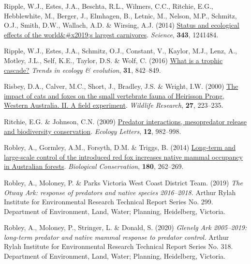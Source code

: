 \documentclass[11pt,a4paper,titlepage,twoside,openright]{style/unimelbthesis}
\newenvironment{CSLReferences}%
  {}%
  {\par}
\begin{document}
\begin{mainmatter}
\begin{CSLReferences}{1}{0}
\leavevmode{}%
Ripple, W.J., Estes, J.A., Beschta, R.L., Wilmers, C.C., Ritchie, E.G., Hebblewhite, M., Berger, J., Elmhagen, B., Letnic, M., Nelson, M.P., Schmitz, O.J., Smith, D.W., Wallach, A.D. \& Wirsing, A.J. (2014) \href{https://doi.org/10.1126/science.1241484}{Status and ecological effects of the world\&\#x2019;s largest carnivores}. \emph{Science}, \textbf{343}, 1241484.

\leavevmode{}%
Ripple, W.J., Estes, J.A., Schmitz, O.J., Constant, V., Kaylor, M.J., Lenz, A., Motley, J.L., Self, K.E., Taylor, D.S. \& Wolf, C. (2016) \href{https://doi.org/10.1016/j.tree.2016.08.010}{What is a trophic cascade?} \emph{Trends in ecology \& evolution}, \textbf{31}, 842--849.

\leavevmode{}%
Risbey, D.A., Calver, M.C., Short, J., Bradley, J.S. \& Wright, I.W. (2000) \href{https://doi.org/10.1071/WR98092}{The impact of cats and foxes on the small vertebrate fauna of {Heirisson Prong, Western {A}ustralia. II. A} field experiment}. \emph{Wildlife Research}, \textbf{27}, 223--235.

\leavevmode{}%
Ritchie, E.G. \& Johnson, C.N. (2009) \href{https://doi.org/10.1111/j.1461-0248.2009.01347.x}{Predator interactions, mesopredator release and biodiversity conservation}. \emph{Ecology Letters}, \textbf{12}, 982--998.

\leavevmode{}%
Robley, A., Gormley, A.M., Forsyth, D.M. \& Triggs, B. (2014) \href{https://doi.org/10.1016/j.biocon.2014.10.017}{Long-term and large-scale control of the introduced red fox increases native mammal occupancy in {{A}ustralian} forests}. \emph{Biological Conservation}, \textbf{180}, 262--269.

\leavevmode{}%
Robley, A., Moloney, P. \& Parks Victoria West Coast District Team. (2019) \emph{{The Otway Ark: response of predators and native species 2016--2018.}} Arthur Rylah Institute for Environmental Research Technical Report Series No. 299. Department of Environment, Land, Water; Planning, Heidelberg, Victoria.

\leavevmode{}%
Robley, A., Moloney, P., Stringer, L. \& Donald, S. (2020) \emph{{Glenelg Ark 2005--2019: long-term predator and native mammal response to predator control.}} Arthur Rylah Institute for Environmental Research Technical Report Series No. 318. Department of Environment, Land, Water; Planning, Heidelberg, Victoria.


\end{CSLReferences}
\end{mainmatter}
\end{document}
